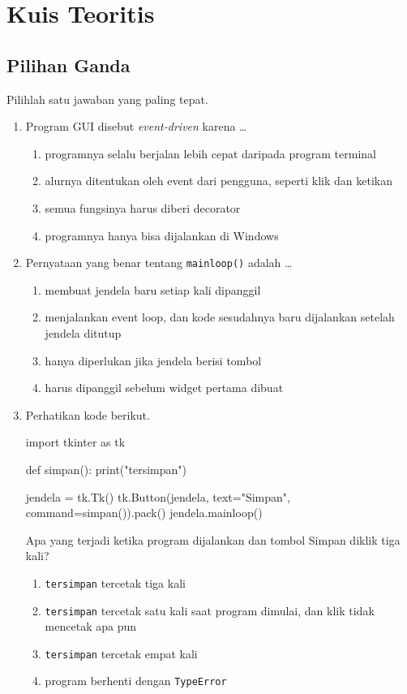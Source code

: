\section{Kuis Teoritis}

\subsection{Pilihan Ganda}

Pilihlah satu jawaban yang paling tepat.

\begin{enumerate}
  \item Program GUI disebut \emph{event-driven} karena \ldots
  \begin{enumerate}[label=\alph*.,itemsep=0pt]
    \item programnya selalu berjalan lebih cepat daripada program terminal
    \item alurnya ditentukan oleh event dari pengguna, seperti klik dan ketikan
    \item semua fungsinya harus diberi decorator
    \item programnya hanya bisa dijalankan di Windows
  \end{enumerate}

  \item Pernyataan yang benar tentang \texttt{mainloop()} adalah \ldots
  \begin{enumerate}[label=\alph*.,itemsep=0pt]
    \item membuat jendela baru setiap kali dipanggil
    \item menjalankan event loop, dan kode sesudahnya baru dijalankan setelah jendela ditutup
    \item hanya diperlukan jika jendela berisi tombol
    \item harus dipanggil sebelum widget pertama dibuat
  \end{enumerate}

  \item Perhatikan kode berikut.
\begin{kode}[Soal 3]
import tkinter as tk

def simpan():
    print("tersimpan")

jendela = tk.Tk()
tk.Button(jendela, text="Simpan", command=simpan()).pack()
jendela.mainloop()
\end{kode}
  Apa yang terjadi ketika program dijalankan dan tombol Simpan diklik tiga kali?
  \begin{enumerate}[label=\alph*.,itemsep=0pt]
    \item \texttt{tersimpan} tercetak tiga kali
    \item \texttt{tersimpan} tercetak satu kali saat program dimulai, dan klik tidak mencetak apa pun
    \item \texttt{tersimpan} tercetak empat kali
    \item program berhenti dengan \texttt{TypeError}
  \end{enumerate}


\end{enumerate}
